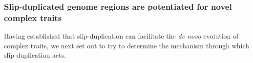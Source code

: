 \subsubsection{Slip-duplicated genome regions are potentiated for novel complex traits}




Having established that slip-duplication can facilitate the \textit{de novo} evolution of complex traits, we next set out to try to determine the mechanism through which slip duplication acts.

